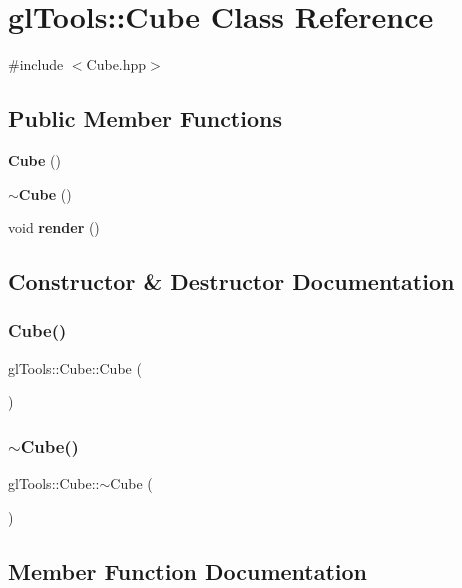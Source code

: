 \section{gl\+Tools\+::Cube Class Reference}
\label{classgl_tools_1_1_cube}


{\ttfamily \#include $<$Cube.\+hpp$>$}

\subsection*{Public Member Functions}
\begin{DoxyCompactItemize}
\item 
\textbf{ Cube} ()
\item 
\textbf{ $\sim$\+Cube} ()
\item 
void \textbf{ render} ()
\end{DoxyCompactItemize}


\subsection{Constructor \& Destructor Documentation}
\mbox{\label{classgl_tools_1_1_cube_af7e3640d2db60aca2acc37d52ad79468}} 
\subsubsection{Cube()}
{\footnotesize\ttfamily gl\+Tools\+::\+Cube\+::\+Cube (\begin{DoxyParamCaption}{ }\end{DoxyParamCaption})}

\mbox{\label{classgl_tools_1_1_cube_abad8d0be4ba014342ddc3799284b341e}} 
\subsubsection{$\sim$Cube()}
{\footnotesize\ttfamily gl\+Tools\+::\+Cube\+::$\sim$\+Cube (\begin{DoxyParamCaption}{ }\end{DoxyParamCaption})}



\subsection{Member Function Documentation}
\mbox{\label{classgl_tools_1_1_cube_a589e39e2f3bf24c535ac2ab74aa30596}} 
